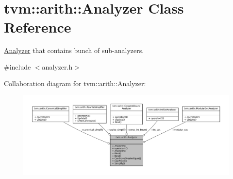\hypertarget{classtvm_1_1arith_1_1Analyzer}{}\section{tvm\+:\+:arith\+:\+:Analyzer Class Reference}
\label{classtvm_1_1arith_1_1Analyzer}


\hyperlink{classtvm_1_1arith_1_1Analyzer}{Analyzer} that contains bunch of sub-\/analyzers.  




{\ttfamily \#include $<$analyzer.\+h$>$}



Collaboration diagram for tvm\+:\+:arith\+:\+:Analyzer\+:
\nopagebreak
\begin{figure}[H]
\begin{center}
\leavevmode
\includegraphics[width=350pt]{classtvm_1_1arith_1_1Analyzer__coll__graph}
\end{center}
\end{figure}
